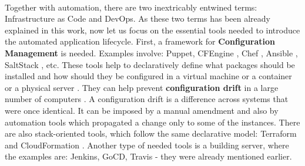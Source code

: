 \paragraph{}
Together with automation, there are two inextricably entwined terms: Infrastructure as Code and DevOps. As these two terms has been already explained in this work, now let us focus on the essential tools needed to introduce the automated application lifecycle. First, a framework for \textbf{Configuration Management} is needed. Examples involve: Puppet, CFEngine \cite{book-iac,book-cicd}, Chef \cite{online-chef}, Ansible \cite{online-ansible}, SaltStack \cite{online-salt}, etc. These tools help to declaratively define what packages should be installed and how should they be configured in a virtual machine or a container or a physical server \cite{book-cicd}. They can help prevent \textbf{configuration drift} in a large number of computers \cite{book-devops-k8s}. A configuration drift is a difference across systems that were once identical. It can be imposed by a manual amendment and also by automation tools which propagated a change only to some of the instances\cite{book-iac}. There are also stack-oriented tools, which follow the same declarative model: Terraform \cite{terraform} and CloudFormation \cite{book-iac}. Another type of needed tools is a building server, where the examples are: Jenkins, GoCD, Travis - they were already mentioned earlier.

